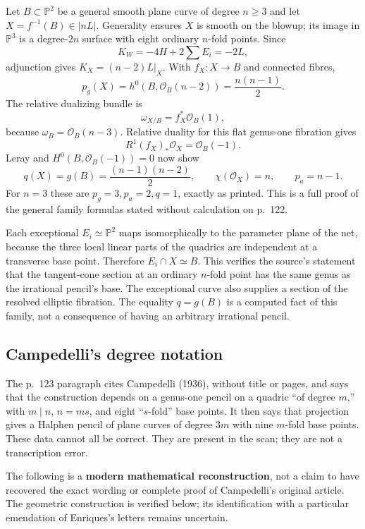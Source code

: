 Let \(B\subset\mathbb P^2\) be a general smooth plane curve of degree \(n\geq3\) and let \(X=f^{-1}(B)\in|nL|\). Generality ensures \(X\) is smooth on the blowup; its image in \(\mathbb P^3\) is a degree-\(2n\) surface with eight ordinary \(n\)-fold points. Since \[
 K_W=-4H+2\sum E_i=-2L,
\] adjunction gives \(K_X=(n-2)L|_X\). With \(f_X:X\to B\) and connected fibres, \[
 p_g(X)=h^0(B,\mathcal O_B(n-2))=\frac{n(n-1)}2.
\] The relative dualizing bundle is \[
 \omega_{X/B}=f_X^*\mathcal O_B(1),
\] because \(\omega_B=\mathcal O_B(n-3)\). Relative duality for this flat genus-one fibration gives \[
 R^1(f_X)_*\mathcal O_X=\mathcal O_B(-1).
\] Leray and \(H^0(B,\mathcal O_B(-1))=0\) now show \[
 q(X)=g(B)=\frac{(n-1)(n-2)}2,\qquad
 \chi(\mathcal O_X)=n,\qquad p_a=n-1.
\] For \(n=3\) these are \(p_g=3,p_a=2,q=1\), exactly as printed. This is a full proof of the general family formulas stated without calculation on p.~122.

Each exceptional \(E_i\simeq\mathbb P^2\) maps isomorphically to the parameter plane of the net, because the three local linear parts of the quadrics are independent at a transverse base point. Therefore \(E_i\cap X\simeq B\). This verifies the source's statement that the tangent-cone section at an ordinary \(n\)-fold point has the same genus as the irrational pencil's base. The exceptional curve also supplies a section of the resolved elliptic fibration. The equality \(q=g(B)\) is a computed fact of this family, not a consequence of having an arbitrary irrational pencil.

\subsection{Campedelli's degree notation}

The p.~123 paragraph cites Campedelli (1936), without title or pages, and says that the construction depends on a genus-one pencil on a quadric ``of degree \(m\),'' with \(m\mid n\), \(n=ms\), and eight ``\(s\)-fold'' base points. It then says that projection gives a Halphen pencil of plane curves of degree \(3m\) with nine \(m\)-fold base points. These data cannot all be correct. They are present in the scan; they are not a transcription error.

The following is a \textbf{modern mathematical reconstruction}, not a claim to have recovered the exact wording or complete proof of Campedelli's original article. The geometric construction is verified below; its identification with a particular emendation of Enriques's letters remains uncertain.

